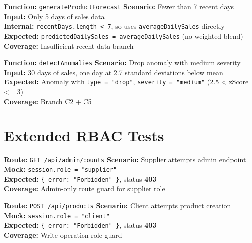 \documentclass[12pt,a4paper]{report}
\newcommand{\pone}{\textbf{\color{p1red}P1}}
\newcommand{\ptwo}{\textbf{\color{p2orange}P2}}
\newcommand{\pthree}{\textbf{\color{p3blue}P3}}
\begin{document}
\begin{tcolorbox}[testbox,title={FORE-017 \hfill \ptwo}]
\textbf{Function:} \texttt{generateProductForecast} \quad \textbf{Scenario:} Fewer than 7 recent days \\
\textbf{Input:} Only 5 days of sales data \\
\textbf{Internal:} \texttt{recentDays.length < 7}, so uses \texttt{averageDailySales} directly \\
\textbf{Expected:} \texttt{predictedDailySales = averageDailySales} (no weighted blend) \\
\textbf{Coverage:} Insufficient recent data branch
\end{tcolorbox}

\begin{tcolorbox}[testbox,title={FORE-018 \hfill \pthree}]
\textbf{Function:} \texttt{detectAnomalies} \quad \textbf{Scenario:} Drop anomaly with medium severity \\
\textbf{Input:} 30 days of sales, one day at 2.7 standard deviations below mean \\
\textbf{Expected:} Anomaly with \texttt{type = "drop"}, \texttt{severity = "medium"} (2.5 < zScore <= 3) \\
\textbf{Coverage:} Branch C2 + C5
\end{tcolorbox}

\section{Extended RBAC Tests}

\begin{tcolorbox}[criticalbox,title={RBAC-006 \hfill \pone\ --- Supplier Cannot Access Admin Routes}]
\textbf{Route:} \texttt{GET /api/admin/counts} \quad \textbf{Scenario:} Supplier attempts admin endpoint \\
\textbf{Mock:} \texttt{session.role = "supplier"} \\
\textbf{Expected:} \texttt{\{ error: "Forbidden" \}}, status \textbf{403} \\
\textbf{Coverage:} Admin-only route guard for supplier role
\end{tcolorbox}

\begin{tcolorbox}[criticalbox,title={RBAC-007 \hfill \pone\ --- Client Cannot Create Products}]
\textbf{Route:} \texttt{POST /api/products} \quad \textbf{Scenario:} Client attempts product creation \\
\textbf{Mock:} \texttt{session.role = "client"} \\
\textbf{Expected:} \texttt{\{ error: "Forbidden" \}}, status \textbf{403} \\
\textbf{Coverage:} Write operation role guard
\end{tcolorbox}
\end{document}
